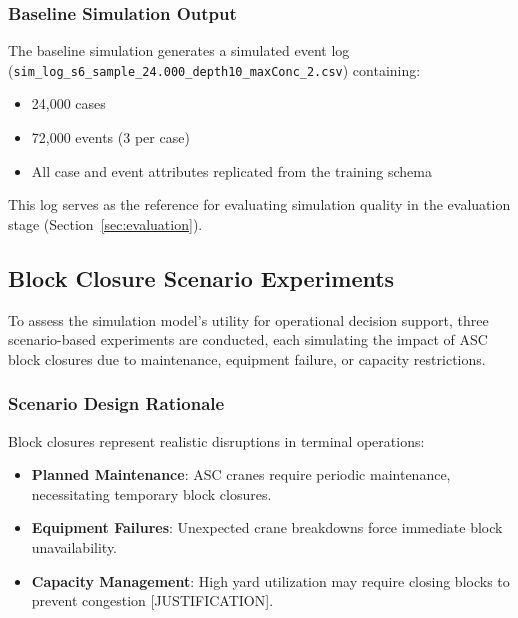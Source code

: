         \subsubsection{Baseline Simulation Output}
        
        The baseline simulation generates a simulated event log (\texttt{sim\_log\_s6\_sample\_24.000\_depth10\_maxConc\_2.csv}) containing:
        
        \begin{itemize}
            \item 24,000 cases
            \item 72,000 events (3 per case)
            \item All case and event attributes replicated from the training schema
        \end{itemize}
        
        This log serves as the reference for evaluating simulation quality in the evaluation stage (Section~\ref{sec:evaluation}).
        
    \subsection{Block Closure Scenario Experiments}
    
    To assess the simulation model's utility for operational decision support, three scenario-based experiments are conducted, each simulating the impact of ASC block closures due to maintenance, equipment failure, or capacity restrictions.

        \subsubsection{Scenario Design Rationale}
        
        Block closures represent realistic disruptions in terminal operations:
        
        \begin{itemize}
            \item \textbf{Planned Maintenance}: ASC cranes require periodic maintenance, necessitating temporary block closures.
            \item \textbf{Equipment Failures}: Unexpected crane breakdowns force immediate block unavailability.
            \item \textbf{Capacity Management}: High yard utilization may require closing blocks to prevent congestion [JUSTIFICATION].
        \end{itemize}
        
